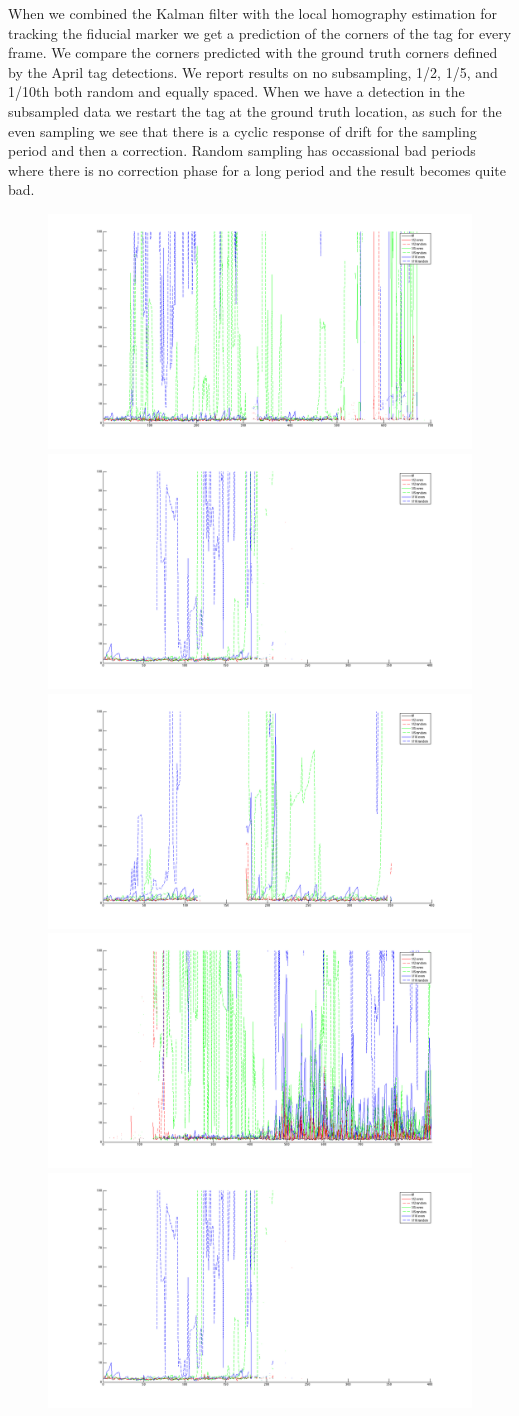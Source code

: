\documentclass[12pt]{article}
\begin{document}
When we combined the Kalman filter with the local homography estimation for tracking the fiducial marker we get a prediction of the corners of the tag for every frame.  We compare the corners predicted with the ground truth corners defined by the April tag detections.  We report results on no subsampling, 1/2, 1/5, and 1/10th both random and equally spaced.  When we have a detection in the subsampled data we restart the tag at the ground truth location, as such for the even sampling we see that there is a cyclic response of drift for the sampling period and then a correction.  Random sampling has occassional bad periods where there is no correction phase for a long period and the result becomes quite bad.
\begin{figure}
\includegraphics[width=.5\textwidth]{Corner_error_nov1.png}
\includegraphics[width=.5\textwidth]{Corner_error_nov2.png}
\includegraphics[width=.5\textwidth]{Corner_error_nov3.png}
\includegraphics[width=.5\textwidth]{Corner_error_dec1.png}
\includegraphics[width=.5\textwidth]{Corner_error_nov2.png}

\end{figure}
\end{document}
